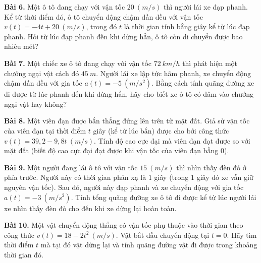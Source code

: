 \documentclass[12pt]{article}
\begin{document}
	\begin{btvang}[title={Mức độ vận dụng}]
		\textbf{Bài 6.} Một ô tô đang chạy với vận tốc $20 \ (m/s)$ thì người lái xe đạp phanh. Kể từ thời điểm đó, ô tô chuyển động chậm dần đều với vận tốc $v(t) = -4t + 20 \ (m/s)$, trong đó $t$ là thời gian tính bằng giây kể từ lúc đạp phanh. Hỏi từ lúc đạp phanh đến khi dừng hẳn, ô tô còn di chuyển được bao nhiêu mét?
		
		\textbf{Bài 7.} Một chiếc xe ô tô đang chạy với vận tốc $72 \ km/h$ thì phát hiện một chướng ngại vật cách đó $45 \ m$. Người lái xe lập tức hãm phanh, xe chuyển động chậm dần đều với gia tốc $a(t) = -5 \ (m/s^2)$. Bằng cách tính quãng đường xe đi được từ lúc phanh đến khi dừng hẳn, hãy cho biết xe ô tô có đâm vào chướng ngại vật hay không?
		
		\textbf{Bài 8.} Một viên đạn được bắn thẳng đứng lên trên từ mặt đất. Giả sử vận tốc của viên đạn tại thời điểm $t$ giây (kể từ lúc bắn) được cho bởi công thức $v(t) = 39,2 - 9,8t \ (m/s)$. Tính độ cao cực đại mà viên đạn đạt được so với mặt đất (biết độ cao cực đại đạt được khi vận tốc của viên đạn bằng $0$).
		
		\textbf{Bài 9.} Một người đang lái ô tô với vận tốc $15 \ (m/s)$ thì nhìn thấy đèn đỏ ở phía trước. Người này có thời gian phản xạ là $1$ giây (trong $1$ giây đó xe vẫn giữ nguyên vận tốc). Sau đó, người này đạp phanh và xe chuyển động với gia tốc $a(t) = -3 \ (m/s^2)$. Tính tổng quãng đường xe ô tô đi được kể từ lúc người lái xe nhìn thấy đèn đỏ cho đến khi xe dừng lại hoàn toàn.
		
		\textbf{Bài 10.} Một vật chuyển động thẳng có vận tốc phụ thuộc vào thời gian theo công thức $v(t) = 18 - 2t^2 \ (m/s)$. Vật bắt đầu chuyển động tại $t = 0$. Hãy tìm thời điểm $t$ mà tại đó vật dừng lại và tính quãng đường vật đi được trong khoảng thời gian đó.
	\end{btvang}
	
\end{document}
